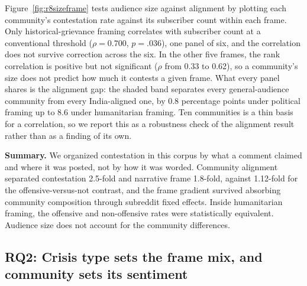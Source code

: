 Figure~\ref{fig:r8sizeframe} tests audience size against alignment by plotting each community's contestation rate against its subscriber count within each frame. Only historical-grievance framing correlates with subscriber count at a conventional threshold ($\rho = 0.700$, $p = .036$), one panel of six, and the correlation does not survive correction across the six. In the other five frames, the rank correlation is positive but not significant ($\rho$ from 0.33 to 0.62), so a community's size does not predict how much it contests a given frame. What every panel shares is the alignment gap: the shaded band separates every general-audience community from every India-aligned one, by 0.8 percentage points under political framing up to 8.6 under humanitarian framing. Ten communities is a thin basis for a correlation, so we report this as a robustness check of the alignment result rather than as a finding of its own.


\textbf{Summary.} We organized contestation in this corpus by what a comment claimed and where it was posted, not by how it was worded. Community alignment separated contestation 2.5-fold and narrative frame 1.8-fold, against 1.12-fold for the offensive-versus-not contrast, and the frame gradient survived absorbing community composition through subreddit fixed effects. Inside humanitarian framing, the offensive and non-offensive rates were statistically equivalent. Audience size does not account for the community differences.


\subsection{RQ2: Crisis type sets the frame mix, and community sets its sentiment}
\label{sec:results-rq2}

